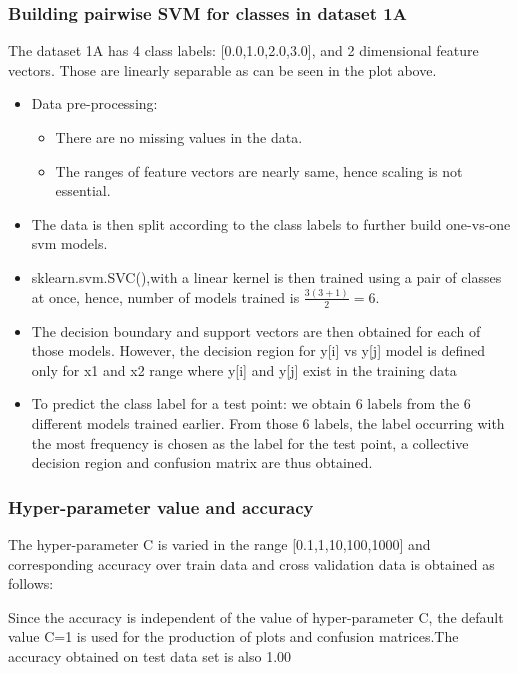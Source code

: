 \documentclass[11pt,a4paper]{article}
\newcommand{\noi}{\noindent}
\begin{document}
\subsubsection{Building pairwise SVM for classes in dataset 1A}
The dataset 1A has 4 class labels: [0.0,1.0,2.0,3.0], and 2 dimensional feature vectors. Those are linearly separable as can be seen in the plot above.
\begin{itemize}
    \item Data pre-processing:
    \begin{itemize}
        \item There are no missing values in the data.
        \item The ranges of feature vectors are nearly same, hence scaling is not essential. 
    \end{itemize}
    \item The data is then split according to the class labels to further build one-vs-one svm models.
    \item sklearn.svm.SVC(),with a linear kernel is then trained using a pair of classes at once, hence, number of models trained is $\frac{3(3+1)}{2}=6$. 
    \item The decision boundary and support vectors are then obtained for each of those models. However, the decision region for y[i] vs y[j] model is defined only for x1 and x2 range where y[i] and y[j] exist in the training data
    \item To predict the class label for a test point: we obtain 6 labels from the 6 different models trained earlier. From those 6 labels, the label occurring with the most frequency is chosen as the label for the test point, a collective decision region and confusion matrix are thus obtained.
\end{itemize}

\subsubsection{Hyper-parameter value and accuracy}
The hyper-parameter C is varied in the range [0.1,1,10,100,1000] and corresponding accuracy over train data and cross validation data is obtained as follows: 


\noi
Since the accuracy is independent of the value of hyper-parameter C, the default value C=1 is used for the production of plots and confusion matrices.The accuracy obtained on test data set is also 1.00 

\noi
\end{document}

